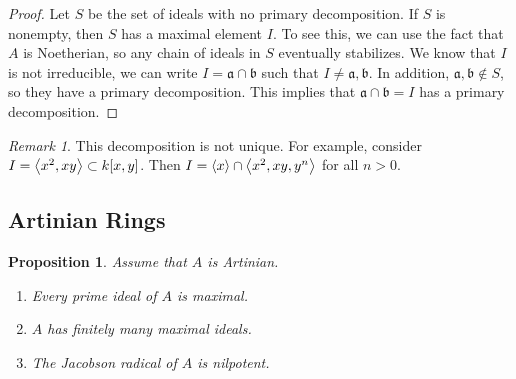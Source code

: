\documentclass[leqno, openany]{memoir}
\newtheorem{prop}[thm]{Proposition}
\theoremstyle{definition}
\theoremstyle{remark}
\newtheorem{rmk}[thm]{Remark}
\theoremstyle{plain}
\theoremstyle{definition}
\theoremstyle{remark}
\newcommand{\mf}[1]{\mathfrak{#1}}
\begin{document}
\begin{proof}
    Let $S$ be the set of ideals with no primary decomposition. If $S$ is nonempty, then $S$ has a maximal element $I$. To see this, we can use the fact that $A$ is Noetherian, so any chain of ideals in $S$ eventually stabilizes. We know that $I$ is not irreducible, we can write $I = \mf{a} \cap \mathfrak{b}$ such that $I \neq \mf{a}, \mf{b}$. In addition, $\mf{a}, \mf{b} \notin S$, so they have a primary decomposition. This implies that $\mf{a} \cap \mf{b} = I$ has a primary decomposition.
\end{proof}

\begin{rmk}
    This decomposition is not unique. For example, consider $I = \ev{ x^2, xy } \subset k[x,y]$. Then $I = \ev{x} \cap \ev{x^2, xy, y^n}$ for all $n > 0$.
\end{rmk}

\subsection{Artinian Rings}%
\label{sub:artinian_rings}

\begin{prop}
    Assume that $A$ is Artinian.
    \begin{enumerate}
        \item Every prime ideal of $A$ is maximal.
        \item $A$ has finitely many maximal ideals.
        \item The Jacobson radical of $A$ is nilpotent.
    \end{enumerate}
\end{prop}
\end{document}
